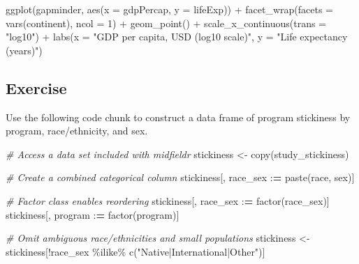 \documentclass[
]{book}
\newenvironment{Shaded}{\begin{snugshade}}{\end{snugshade}}
\newcommand{\AttributeTok}[1]{\textcolor[rgb]{0.77,0.63,0.00}{#1}}
\newcommand{\CommentTok}[1]{\textcolor[rgb]{0.56,0.35,0.01}{\textit{#1}}}
\newcommand{\DecValTok}[1]{\textcolor[rgb]{0.00,0.00,0.81}{#1}}
\newcommand{\ErrorTok}[1]{\textcolor[rgb]{0.64,0.00,0.00}{\textbf{#1}}}
\newcommand{\FunctionTok}[1]{\textcolor[rgb]{0.00,0.00,0.00}{#1}}
\newcommand{\NormalTok}[1]{#1}
\newcommand{\OtherTok}[1]{\textcolor[rgb]{0.56,0.35,0.01}{#1}}
\newcommand{\SpecialCharTok}[1]{\textcolor[rgb]{0.00,0.00,0.00}{#1}}
\newcommand{\StringTok}[1]{\textcolor[rgb]{0.31,0.60,0.02}{#1}}
\begin{document}
\begin{Shaded}
\begin{Highlighting}[]
\FunctionTok{ggplot}\NormalTok{(gapminder, }\FunctionTok{aes}\NormalTok{(}\AttributeTok{x =}\NormalTok{ gdpPercap, }\AttributeTok{y =}\NormalTok{ lifeExp)) }\SpecialCharTok{+}
  \FunctionTok{facet\_wrap}\NormalTok{(}\AttributeTok{facets =} \FunctionTok{vars}\NormalTok{(continent), }\AttributeTok{ncol =} \DecValTok{1}\NormalTok{) }\SpecialCharTok{+}
  \FunctionTok{geom\_point}\NormalTok{() }\SpecialCharTok{+}
  \FunctionTok{scale\_x\_continuous}\NormalTok{(}\AttributeTok{trans =} \StringTok{"log10"}\NormalTok{) }\SpecialCharTok{+}
  \FunctionTok{labs}\NormalTok{(}\AttributeTok{x =} \StringTok{"GDP per capita, USD (log10 scale)"}\NormalTok{, }
       \AttributeTok{y =} \StringTok{"Life expectancy (years)"}\NormalTok{) }
\end{Highlighting}
\end{Shaded}

\hypertarget{exercise-5}{%
\subsection{Exercise}\label{exercise-5}}

Use the following code chunk to construct a data frame of program stickiness by program, race/ethnicity, and sex.

\begin{Shaded}
\begin{Highlighting}[]
\CommentTok{\# Access a data set included with midfieldr}
\NormalTok{stickiness }\OtherTok{\textless{}{-}} \FunctionTok{copy}\NormalTok{(study\_stickiness)}

\CommentTok{\# Create a combined categorical column }
\NormalTok{stickiness[, race\_sex }\SpecialCharTok{:}\ErrorTok{=} \FunctionTok{paste}\NormalTok{(race, sex)]}

\CommentTok{\# Factor class enables reordering }
\NormalTok{stickiness[, race\_sex }\SpecialCharTok{:}\ErrorTok{=} \FunctionTok{factor}\NormalTok{(race\_sex)]}
\NormalTok{stickiness[, program }\SpecialCharTok{:}\ErrorTok{=} \FunctionTok{factor}\NormalTok{(program)]}

\CommentTok{\# Omit ambiguous race/ethnicities and small populations}
\NormalTok{stickiness }\OtherTok{\textless{}{-}}\NormalTok{ stickiness[}\SpecialCharTok{!}\NormalTok{race\_sex }\SpecialCharTok{\%ilike\%} \FunctionTok{c}\NormalTok{(}\StringTok{"Native|International|Other"}\NormalTok{)]}
\end{Highlighting}
\end{Shaded}
\end{document}
